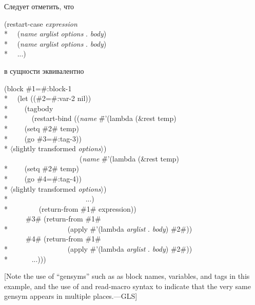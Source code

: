 \begin{defmac}
\begin{flushdesc}
\end{flushdesc}
Следует отметить, что 
\begin{lisp}
(restart-case \emph{expression} \\*
~~(\emph{name} \emph{arglist} \emph{options} . \emph{body}) \\*
~~(\emph{name} \emph{arglist} \emph{options} . \emph{body}) \\*
~~...)
\end{lisp}
в сущности эквивалентно
\begin{lisp}
(block \#1=\#:block-1 \\*
~~(let ((\#2=\#:var-2 nil)) \\*
~~~~(tagbody \\*
~~~~~~(restart-bind ((\emph{name} \=\#'(lambda (\&rest temp) \\*
\>~~~~(setq \#2\# temp) \\*
\>~~~~(go \#3=\#:tag-3)) \\*
\>\textrm{$\langle$slightly transformed \emph{options}$\rangle$}) \\
~~~~~~~~~~~~~~~~~~~~~(\emph{name} \=\#'(lambda (\&rest temp) \\*
\>~~~~(setq \#2\# temp) \\*
\>~~~~(go \#4=\#:tag-4)) \\*
\>\textrm{$\langle$slightly transformed \emph{options}$\rangle$}) \\*
~~~~~~~~~~~~~~~~~~~~~...) \\*
~~~~~~~~(return-from \#1\# expression)) \\
~~~~~~\#3\# (return-from \#1\# \\*
~~~~~~~~~~~~~~~~(apply \#'(lambda \emph{arglist} . \emph{body}) \#2\#)) \\
~~~~~~\#4\# (return-from \#1\# \\*
~~~~~~~~~~~~~~~~(apply \#'(lambda \emph{arglist} . \emph{body}) \#2\#)) \\*
~~~~~~...)))
\end{lisp}
[Note the use of ``gensyms'' such as  as block names,
variables, and  tags in this example,
and the use of  and  read-macro syntax
to indicate that the very same gensym appears in multiple places.---GLS]


\end{defmac}
